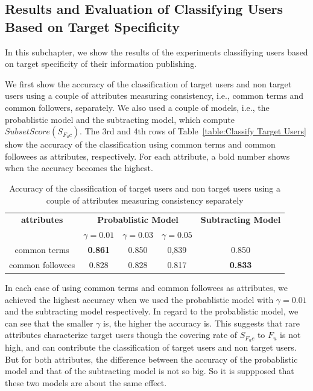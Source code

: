 \subsection{Results and Evaluation of Classifying Users Based on Target
  Specificity}
\label{subsec:Results of Method1}

In this subchapter, we show the results of the experiments classifiying
users based on target specificity of their information publishing.

We first show the accuracy of the classification of target users and
non target users using a couple of attributes measuring consistency,
i.e., common terms and common followers, separately.  We also used a
couple of models, i.e., the
probablistic model and the subtracting model, which compute
$\mathit{SubsetScore}(S_{F_uc})$.
The 3rd and 4th rows of Table~\ref{table:Classify
Target Users} show the accuracy of the classification using common
terms and common followees as attributes, respectively.  For each
attribute, a bold number shows when the accuracy becomes the highest.

\begin{table}[t]
\caption{Accuracy of the classification of target users and non target
 users using a couple of attributes measuring consistency separately
 \label{table:Classify Target Users}}
\begin{center}
\begin{tabular}{ccccc}
 \toprule
 {\bf attributes} & \multicolumn{3}{c}{{\bf Probablistic Model}} & {\bf
 Subtracting Model} \\
 & $\gamma = 0.01$ & $\gamma = 0.03$ & $\gamma = 0.05$ & \\
 \cmidrule(lr){1-1}\cmidrule(lr){2-4}\cmidrule(lr){5-5}
 common terms & {\bf 0.861} & 0.850 & 0,839 & 0.850 \\
 common followees & 0.828 & 0.828 & 0.817 & {\bf 0.833} \\
 \bottomrule
\end{tabular}
\end{center}
\end{table}

In each case of using common terms and common followees as attributes,
we achieved the highest accuracy when we used the probablistic model
with $\gamma = 0.01$ and the subtracting model respectively.  In regard
to the probablistic model, we can see that the smaller $\gamma$ is,
the higher the accuracy is.  This suggests that rare attributes
characterize target users though the covering rate of $S_{F_uc}$ to
$F_u$ is not high, and can contribute the classification of target users
and non target users.  But for both attributes, the difference between
the accuracy of the probablistic model and that of the subtracting
model is not so big.  So it is suppposed that these two models are
about the same effect.

